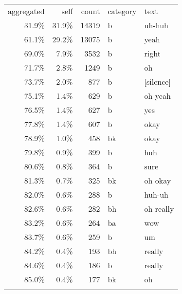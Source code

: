 \begin{tabular}{rrrll}
\hline\noalign{\smallskip}
aggregated & self & count & category & text \\
\noalign{\smallskip}\svhline\noalign{\smallskip}
31.9\% & 31.9\% & 14319 & b & uh-huh \\
61.1\% & 29.2\% & 13075 & b & yeah \\
69.0\% & 7.9\% & 3532 & b & right \\
71.7\% & 2.8\% & 1249 & b & oh \\
73.7\% & 2.0\% & 877 & b & [silence] \\
75.1\% & 1.4\% & 629 & b & oh yeah \\
76.5\% & 1.4\% & 627 & b & yes \\
77.8\% & 1.4\% & 607 & b & okay \\
78.9\% & 1.0\% & 458 & bk & okay \\
79.8\% & 0.9\% & 399 & b & huh \\
80.6\% & 0.8\% & 364 & b & sure \\
81.3\% & 0.7\% & 325 & bk & oh okay \\
82.0\% & 0.6\% & 288 & b & huh-uh \\
82.6\% & 0.6\% & 282 & bh & oh really \\
83.2\% & 0.6\% & 264 & ba & wow \\
83.7\% & 0.6\% & 259 & b & um \\
84.2\% & 0.4\% & 193 & bh & really \\
84.6\% & 0.4\% & 186 & b & really \\
85.0\% & 0.4\% & 177 & bk & oh \\
\noalign{\smallskip}\hline\noalign{\smallskip}
\end{tabular}
